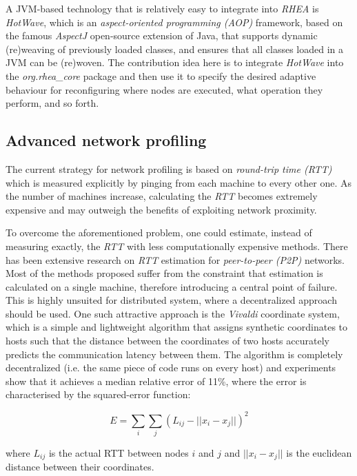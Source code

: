 \documentclass[sigplan,review,anonymous]{acmart}\settopmatter{printfolios=true}
\begin{document}
A JVM-based technology that is relatively easy to integrate into \textit{RHEA} is \textit{HotWave}\cite{reconf_java}, which is an \textit{aspect-oriented programming (AOP)} framework, based on the famous \textit{AspectJ} open-source extension of Java, that supports dynamic (re)weaving of previously loaded classes, and ensures that all classes loaded in a JVM can be (re)woven. The contribution idea here is to integrate \textit{HotWave} into the \textit{org.rhea\_core} package and then use it to specify the desired adaptive behaviour for reconfiguring where nodes are executed, what operation they perform, and so forth.

\subsection{Advanced network profiling}

The current strategy for network profiling is based on \textit{round-trip time (RTT)} which is measured explicitly by pinging from each machine to every other one. As the number of machines increase, calculating the \textit{RTT} becomes extremely expensive and may outweigh the benefits of exploiting network proximity. 

To overcome the aforementioned problem, one could estimate, instead of measuring exactly, the \textit{RTT} with less computationally expensive methods. There has been extensive research on \textit{RTT} estimation for \textit{peer-to-peer (P2P)} networks\cite{rtt_survey}. Most of the methods proposed suffer from the constraint that estimation is calculated on a single machine, therefore introducing a central point of failure. This is highly unsuited for distributed system, where a decentralized approach should be used. One such attractive approach is the \textit{Vivaldi} coordinate system\cite{vivaldi}, which is a simple and lightweight algorithm that assigns synthetic coordinates to hosts such that the distance between the coordinates of two hosts accurately predicts the communication latency between them. The algorithm is completely decentralized (i.e. the same piece of code runs on every host) and experiments show that it achieves a median relative error of 11\%, where the error is characterised by the squared-error function:

\[ E =  \sum_i \sum_j (L_{ij}-||x_i - x_j||)^2  \]

where $L_{ij}$ is the actual RTT between nodes $i$ and $j$ and $||x_i - x_j||$ is the euclidean distance between their coordinates.
\end{document}
